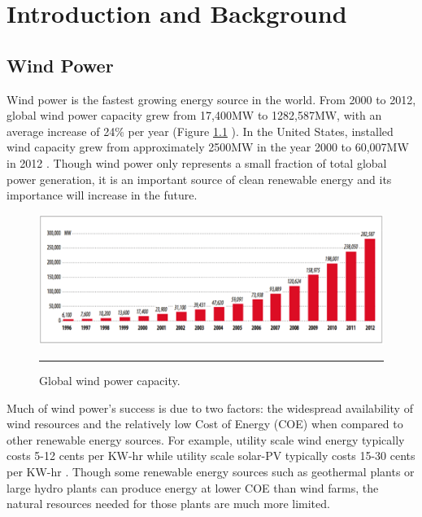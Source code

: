 
\chapter{Introduction and Background} %

\label{Chapter1} %



\section{Wind Power}

Wind power is the fastest growing energy source in the world.  From 2000 to 2012, global wind power capacity grew from 17,400MW to 1282,587MW, with an average increase of 24\% per year (Figure \ref{fig1-1} ). In the United States, installed wind capacity grew from approximately 2500MW in the year 2000 to 60,007MW in 2012 \cite{williams2012}. Though wind power only represents a small fraction of total global power generation, it is an important source of clean renewable energy and its importance will increase in the future.

\begin{figure}[htbp]
	\centering
		\includegraphics[width=\linewidth]{Figures/ch1Figures/fig1-1.png}
		\rule{35em}{0.5pt}
	\caption{Global wind power capacity. \cite{sawyer2012}}
	\label{fig1-1}
\end{figure}

Much of wind power’s success is due to two factors: the widespread availability of wind resources and the relatively low Cost of Energy (COE) when compared to other renewable energy sources.  For example, utility scale wind energy typically costs 5-12 cents per KW-hr while utility scale solar-PV typically costs 15-30 cents per KW-hr \cite{ren212011}. Though some renewable energy sources such as geothermal plants or large hydro plants can produce energy at lower COE than wind farms, the natural resources needed for those plants are much more limited.  


